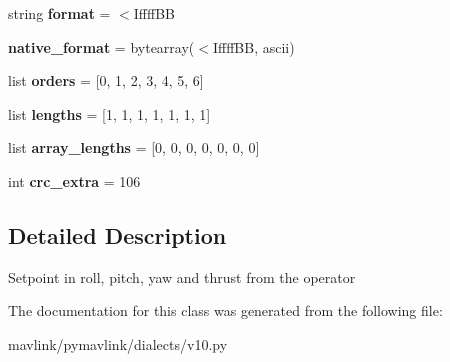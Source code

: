 \begin{DoxyCompactItemize}
string {\bfseries format} = \textquotesingle{}$<$Iffff\+BB\textquotesingle{}
\item 
\mbox{\label{classpymavlink_1_1dialects_1_1v10_1_1MAVLink__manual__setpoint__message_a713186ce8b2413f82a1f4a786b295ef5}} 
{\bfseries native\+\_\+format} = bytearray(\textquotesingle{}$<$Iffff\+BB\textquotesingle{}, \textquotesingle{}ascii\textquotesingle{})
\item 
\mbox{\label{classpymavlink_1_1dialects_1_1v10_1_1MAVLink__manual__setpoint__message_a2010642f2cb5e2243265ea408c225ba5}} 
list {\bfseries orders} = \mbox{[}0, 1, 2, 3, 4, 5, 6\mbox{]}
\item 
\mbox{\label{classpymavlink_1_1dialects_1_1v10_1_1MAVLink__manual__setpoint__message_ada165b3ebca88abf94a24e4cf8280db7}} 
list {\bfseries lengths} = \mbox{[}1, 1, 1, 1, 1, 1, 1\mbox{]}
\item 
\mbox{\label{classpymavlink_1_1dialects_1_1v10_1_1MAVLink__manual__setpoint__message_ac82f815e5bce1227c786768801009c76}} 
list {\bfseries array\+\_\+lengths} = \mbox{[}0, 0, 0, 0, 0, 0, 0\mbox{]}
\item 
\mbox{\label{classpymavlink_1_1dialects_1_1v10_1_1MAVLink__manual__setpoint__message_afd0086342e61af4137b7a1e2b40bddec}} 
int {\bfseries crc\+\_\+extra} = 106
\end{DoxyCompactItemize}


\subsection{Detailed Description}
\begin{DoxyVerb}Setpoint in roll, pitch, yaw and thrust from the operator
\end{DoxyVerb}
 

The documentation for this class was generated from the following file\+:\begin{DoxyCompactItemize}
\item 
mavlink/pymavlink/dialects/v10.\+py\end{DoxyCompactItemize}
